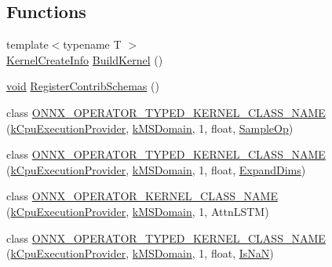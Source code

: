 \subsection*{Functions}
\begin{DoxyCompactItemize}
\item 
{\footnotesize template$<$typename T $>$ }\\\mbox{\hyperlink{structonnxruntime_1_1KernelCreateInfo}{Kernel\+Create\+Info}} \mbox{\hyperlink{namespaceonnxruntime_1_1contrib_a9d0f26b3ab6255e75af689b5f7918861}{Build\+Kernel}} ()
\item 
\mbox{\hyperlink{mlasi_8h_a88f941d423cb2a819b70a1358982b1a6}{void}} \mbox{\hyperlink{namespaceonnxruntime_1_1contrib_aa4c5b16cc0a80f9d630b6a8353a433d0}{Register\+Contrib\+Schemas}} ()
\item 
class \mbox{\hyperlink{namespaceonnxruntime_1_1contrib_aca8465d81f4db84cea4e4e360b6e2e78}{O\+N\+N\+X\+\_\+\+O\+P\+E\+R\+A\+T\+O\+R\+\_\+\+T\+Y\+P\+E\+D\+\_\+\+K\+E\+R\+N\+E\+L\+\_\+\+C\+L\+A\+S\+S\+\_\+\+N\+A\+ME}} (\mbox{\hyperlink{namespaceonnxruntime_a394a3c7e50622de1f203a96df592060d}{k\+Cpu\+Execution\+Provider}}, \mbox{\hyperlink{namespaceonnxruntime_a1e63b08774e23395d961e8e35fb62db1}{k\+M\+S\+Domain}}, 1, float, \mbox{\hyperlink{classonnxruntime_1_1contrib_1_1SampleOp}{Sample\+Op}})
\item 
class \mbox{\hyperlink{namespaceonnxruntime_1_1contrib_a3e4aff6a9b6bb9266985da5c3583a0b1}{O\+N\+N\+X\+\_\+\+O\+P\+E\+R\+A\+T\+O\+R\+\_\+\+T\+Y\+P\+E\+D\+\_\+\+K\+E\+R\+N\+E\+L\+\_\+\+C\+L\+A\+S\+S\+\_\+\+N\+A\+ME}} (\mbox{\hyperlink{namespaceonnxruntime_a394a3c7e50622de1f203a96df592060d}{k\+Cpu\+Execution\+Provider}}, \mbox{\hyperlink{namespaceonnxruntime_a1e63b08774e23395d961e8e35fb62db1}{k\+M\+S\+Domain}}, 1, float, \mbox{\hyperlink{classonnxruntime_1_1contrib_1_1ExpandDims}{Expand\+Dims}})
\item 
class \mbox{\hyperlink{namespaceonnxruntime_1_1contrib_a27e2b17db8575028ac91e6bc196cceed}{O\+N\+N\+X\+\_\+\+O\+P\+E\+R\+A\+T\+O\+R\+\_\+\+K\+E\+R\+N\+E\+L\+\_\+\+C\+L\+A\+S\+S\+\_\+\+N\+A\+ME}} (\mbox{\hyperlink{namespaceonnxruntime_a394a3c7e50622de1f203a96df592060d}{k\+Cpu\+Execution\+Provider}}, \mbox{\hyperlink{namespaceonnxruntime_a1e63b08774e23395d961e8e35fb62db1}{k\+M\+S\+Domain}}, 1, Attn\+L\+S\+TM)
\item 
class \mbox{\hyperlink{namespaceonnxruntime_1_1contrib_a1cacb5738d8d0b8a890ca0f2921234fa}{O\+N\+N\+X\+\_\+\+O\+P\+E\+R\+A\+T\+O\+R\+\_\+\+T\+Y\+P\+E\+D\+\_\+\+K\+E\+R\+N\+E\+L\+\_\+\+C\+L\+A\+S\+S\+\_\+\+N\+A\+ME}} (\mbox{\hyperlink{namespaceonnxruntime_a394a3c7e50622de1f203a96df592060d}{k\+Cpu\+Execution\+Provider}}, \mbox{\hyperlink{namespaceonnxruntime_a1e63b08774e23395d961e8e35fb62db1}{k\+M\+S\+Domain}}, 1, float, \mbox{\hyperlink{classonnxruntime_1_1contrib_1_1IsNaN}{Is\+NaN}})

\end{DoxyCompactItemize}
